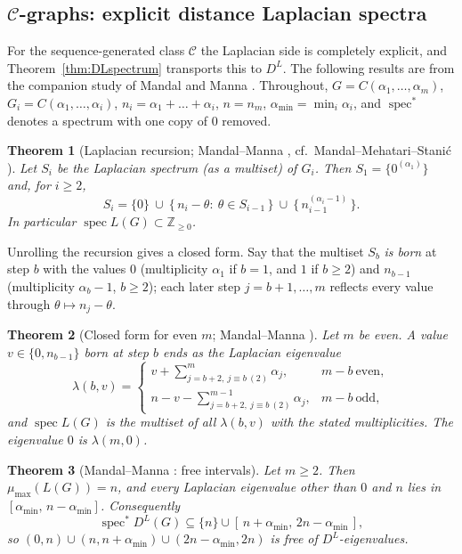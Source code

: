 \documentclass[11pt]{article}
\theoremstyle{plain}
\newtheorem{theorem}{Theorem}[section]
\theoremstyle{definition}
\theoremstyle{remark}
\DeclareMathOperator{\spec}{spec}
\begin{document}
	\subsection{\texorpdfstring{$\mathcal C$}{C}-graphs: explicit distance Laplacian spectra}
	\label{sub:DLC}
	
	For the sequence-generated class $\mathcal C$ the Laplacian side is completely explicit, and Theorem~\ref{thm:DLspectrum} transports this to $D^L$. The following results are from the companion study of Mandal and Manna \cite{MandalManna2026DLDQ}. Throughout, $G=C(\alpha_1,\dots,\alpha_m)$, $G_i=C(\alpha_1,\dots,\alpha_i)$, $n_i=\alpha_1+\dots+\alpha_i$, $n=n_m$, $\alpha_{\min}=\min_i\alpha_i$, and $\spec^*$ denotes a spectrum with one copy of $0$ removed.
	
	\begin{theorem}[Laplacian recursion; Mandal--Manna \cite{MandalManna2026DLDQ}, cf.\ Mandal--Mehatari--Stani\'c \cite{MandalMehatariStanic2024}]
		\label{thm:CLrecursion}
		Let $S_i$ be the Laplacian spectrum (as a multiset) of $G_i$. Then $S_1=\{0^{(\alpha_1)}\}$ and, for $i\ge2$,
		\[
		S_i=\{0\}\ \cup\ \{\,n_i-\theta:\ \theta\in S_{i-1}\,\}\ \cup\ \{\,n_{i-1}^{(\alpha_i-1)}\,\}.
		\]
		In particular $\spec L(G)\subset\mathbb Z_{\ge0}$.
	\end{theorem}
	
	Unrolling the recursion gives a closed form. Say that the multiset $S_b$ \emph{is born} at step $b$ with the values $0$ (multiplicity $\alpha_1$ if $b=1$, and $1$ if $b\ge2$) and $n_{b-1}$ (multiplicity $\alpha_b-1$, $b\ge2$); each later step $j=b+1,\dots,m$ reflects every value through $\theta\mapsto n_j-\theta$.
	
	\begin{theorem}[Closed form for even $m$; Mandal--Manna \cite{MandalManna2026DLDQ}]
		\label{thm:CLclosed}
		Let $m$ be even. A value $v\in\{0,n_{b-1}\}$ born at step $b$ ends as the Laplacian eigenvalue
		\[
		\lambda(b,v)=\begin{cases} v+\sum_{j=b+2,\ j\equiv b\ (2)}^{m}\alpha_j, & m-b\ \text{even},\\[2pt] n-v-\sum_{j=b+2,\ j\equiv b\ (2)}^{m-1}\alpha_j, & m-b\ \text{odd},\end{cases}
		\]
		and $\spec L(G)$ is the multiset of all $\lambda(b,v)$ with the stated multiplicities. The eigenvalue $0$ is $\lambda(m,0)$.
	\end{theorem}
	
	\begin{theorem}[Mandal--Manna \cite{MandalManna2026DLDQ}: free intervals]
		\label{thm:CLfree}
		Let $m\ge2$. Then $\mu_{\max}(L(G))=n$, and every Laplacian eigenvalue other than $0$ and $n$ lies in $[\alpha_{\min},\,n-\alpha_{\min}]$. Consequently
		\[
		\spec^*D^L(G)\subseteq\{n\}\cup[\,n+\alpha_{\min},\,2n-\alpha_{\min}\,],
		\]
		so $(0,n)\cup(n,n+\alpha_{\min})\cup(2n-\alpha_{\min},2n)$ is free of $D^L$-eigenvalues.
	\end{theorem}
	
\end{document}
